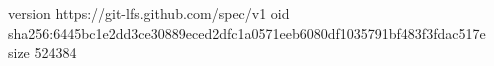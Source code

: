 version https://git-lfs.github.com/spec/v1
oid sha256:6445bc1e2dd3ce30889eced2dfc1a0571eeb6080df1035791bf483f3fdac517e
size 524384
